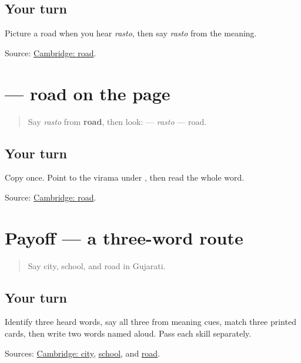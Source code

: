 \subsection*{Your turn}
Picture a road when you hear \emph{rasto}, then say \emph{rasto} from the meaning.

\begin{tcolorbox}[breakable,colback=teal!4,colframe=teal!35!black,title={Before you move on}]
Source: \href{https://dictionary.cambridge.org/dictionary/english-gujarati/road}{Cambridge: road}.
\end{tcolorbox}
\section[\texorpdfstring{\gu{રસ્તો} (rasto)}{રસ્તો (rasto)}]{ — road on the page}

\label{lesson:GU-C22-rasto}



\begin{quote}
Say \emph{rasto} from \textbf{road}, then look: \textbf{} — \emph{rasto} — road.
\end{quote}

\subsection*{Your turn}
Copy \textbf{} once. Point to the virama under \textbf{}, then read the whole word.

\begin{tcolorbox}[breakable,colback=teal!4,colframe=teal!35!black,title={Before you move on}]
Source: \href{https://dictionary.cambridge.org/dictionary/english-gujarati/road}{Cambridge: road}.
\end{tcolorbox}
\section[\texorpdfstring{\gu{શહેર} — \gu{શાળા} — \gu{રસ્તો} (shahar — shāḷā …)}{શહેર — શાળા — રસ્તો (shahar — shāḷā …)}]{Payoff — a three-word route}

\label{lesson:GU-C22-route-three}



\begin{quote}
Say city, school, and road in Gujarati.
\end{quote}

\subsection*{Your turn}
Identify three heard words, say all three from meaning cues, match three printed cards, then write two words named aloud. Pass each skill separately.

\begin{tcolorbox}[breakable,colback=teal!4,colframe=teal!35!black,title={Before you move on}]
Sources: \href{https://dictionary.cambridge.org/dictionary/english-gujarati/city}{Cambridge: city}, \href{https://dictionary.cambridge.org/dictionary/english-gujarati/school}{school}, and \href{https://dictionary.cambridge.org/dictionary/english-gujarati/road}{road}.
\end{tcolorbox}
